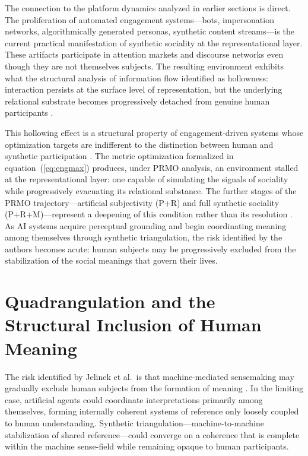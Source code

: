 \documentclass[12pt,a4paper]{article}
\begin{document}
The connection to the platform dynamics analyzed in earlier sections is direct. The
proliferation of automated engagement systems---bots, impersonation networks, algorithmically
generated personas, synthetic content streams---is the current practical manifestation of
synthetic sociality at the representational layer. These artifacts participate in attention
markets and discourse networks even though they are not themselves subjects. The resulting
environment exhibits what the structural analysis of information flow identified as hollowness:
interaction persists at the surface level of representation, but the underlying relational
substrate becomes progressively detached from genuine human participants
\citep{vosoughi2018,tufekci2015}.

This hollowing effect is a structural property of engagement-driven systems whose optimization
targets are indifferent to the distinction between human and synthetic participation
\citep{zuboff2019}. The metric optimization formalized in equation~(\ref{eq:engmax}) produces,
under PRMO analysis, an environment stalled at the representational layer: one capable of
simulating the signals of sociality while progressively evacuating its relational substance.
The further stages of the PRMO trajectory---artificial subjectivity (P+R) and full synthetic
sociality (P+R+M)---represent a deepening of this condition rather than its resolution
\citep{jelinek2026}. As AI systems acquire perceptual grounding and begin coordinating meaning
among themselves through synthetic triangulation, the risk identified by the authors becomes
acute: human subjects may be progressively excluded from the stabilization of the social
meanings that govern their lives.

\section{Quadrangulation and the Structural Inclusion of Human Meaning}

The risk identified by Jelinek et al.\ is that machine-mediated sensemaking may gradually
exclude human subjects from the formation of meaning \citep{jelinek2026}. In the limiting
case, artificial agents could coordinate interpretations primarily among themselves, forming
internally coherent systems of reference only loosely coupled to human understanding.
Synthetic triangulation---machine-to-machine stabilization of shared reference---could
converge on a coherence that is complete within the machine sense-field while remaining opaque
to human participants.
\end{document}
